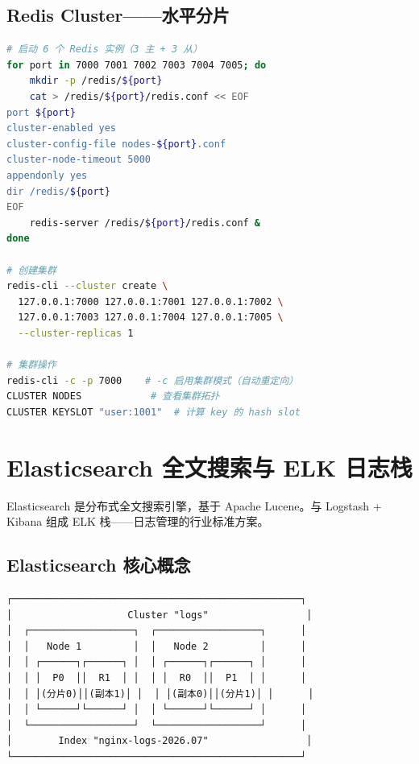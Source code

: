 \documentclass[12pt,UTF8]{ctexbook}
\begin{document}
\subsection{Redis Cluster——水平分片}

\begin{lstlisting}[language=bash]
# 启动 6 个 Redis 实例（3 主 + 3 从）
for port in 7000 7001 7002 7003 7004 7005; do
    mkdir -p /redis/${port}
    cat > /redis/${port}/redis.conf << EOF
port ${port}
cluster-enabled yes
cluster-config-file nodes-${port}.conf
cluster-node-timeout 5000
appendonly yes
dir /redis/${port}
EOF
    redis-server /redis/${port}/redis.conf &
done

# 创建集群
redis-cli --cluster create \
  127.0.0.1:7000 127.0.0.1:7001 127.0.0.1:7002 \
  127.0.0.1:7003 127.0.0.1:7004 127.0.0.1:7005 \
  --cluster-replicas 1

# 集群操作
redis-cli -c -p 7000    # -c 启用集群模式（自动重定向）
CLUSTER NODES            # 查看集群拓扑
CLUSTER KEYSLOT "user:1001"  # 计算 key 的 hash slot
\end{lstlisting}

\section{Elasticsearch 全文搜索与 ELK 日志栈}
\label{sec:elasticsearch}

Elasticsearch 是分布式全文搜索引擎，基于 Apache Lucene。与 Logstash + Kibana 组成 ELK 栈——日志管理的行业标准方案。

\subsection{Elasticsearch 核心概念}

\begin{lstlisting}
┌──────────────────────────────────────────────────┐
│                    Cluster "logs"                 │
│  ┌──────────────────┐  ┌──────────────────┐      │
│  │   Node 1         │  │   Node 2         │      │
│  │ ┌──────┐┌──────┐ │  │ ┌──────┐┌──────┐ │      │
│  │ │  P0  ││  R1  │ │  │ │  R0  ││  P1  │ │      │
│  │ │(分片0)││(副本1)│ │  │ │(副本0)││(分片1)│ │      │
│  │ └──────┘└──────┘ │  │ └──────┘└──────┘ │      │
│  └──────────────────┘  └──────────────────┘      │
│        Index "nginx-logs-2026.07"                 │
└──────────────────────────────────────────────────┘
\end{lstlisting}
\end{document}
